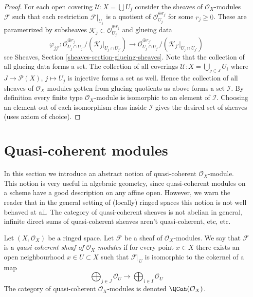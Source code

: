 \begin{proof}
For each open covering $\mathcal{U} : X = \bigcup U_j$ consider the
sheaves of $\mathcal{O}_X$-modules $\mathcal{F}$ such that each
restriction $\mathcal{F}|_{U_j}$ is a quotient of
$\mathcal{O}_{U_j}^{\oplus r_j}$ for some $r_j \geq 0$.
These are parametrized by subsheaves
$\mathcal{K}_j \subset \mathcal{O}_{U_j}^{\oplus r_j}$ and glueing
data
$$
\varphi_{jj'} :
\mathcal{O}_{U_j \cap U_{j'}}^{\oplus r_j}/
(\mathcal{K}_j|_{U_j \cap U_{j'}})
\longrightarrow
\mathcal{O}_{U_j \cap U_{j'}}^{\oplus r_{j'}}/
(\mathcal{K}_{j'}|_{U_j \cap U_{j'}})
$$
see Sheaves, Section \ref{sheaves-section-glueing-sheaves}.
Note that the collection of all glueing data forms a set.
The collection of all coverings $\mathcal{U} : X = \bigcup_{j \in J} U_i$
where $J \to \mathcal{P}(X)$, $j \mapsto U_j$ is injective forms a set as
well. Hence the collection of all sheaves of $\mathcal{O}_X$-modules
gotten from glueing quotients as above forms a set $\mathcal{I}$.
By definition every finite type $\mathcal{O}_X$-module
is isomorphic to an element of $\mathcal{I}$. Choosing an
element out of each isomorphism class inside $\mathcal{I}$
gives the desired set of sheaves (uses axiom of choice).
\end{proof}













\section{Quasi-coherent modules}
\label{section-quasi-coherent}

\noindent
In this section we introduce an abstract notion of
quasi-coherent $\mathcal{O}_X$-module. This notion is very
useful in algebraic geometry, since quasi-coherent modules
on a scheme have a good description on any affine open.
However, we warn the reader that
in the general setting of (locally) ringed spaces
this notion is not well behaved at all. The category of
quasi-coherent sheaves is not abelian in general, infinite
direct sums of quasi-coherent sheaves aren't quasi-coherent, etc, etc.

\begin{definition}
\label{definition-quasi-coherent}
Let $(X, \mathcal{O}_X)$ be a ringed space.
Let $\mathcal{F}$ be a sheaf of $\mathcal{O}_X$-modules.
We say that $\mathcal{F}$ is a {\it quasi-coherent
sheaf of $\mathcal{O}_X$-modules} if for every
point $x \in X$ there exists an open neighbourhood
$x\in U \subset X$ such that $\mathcal{F}|_U$
is isomorphic to the cokernel of a map
$$
\bigoplus\nolimits_{j \in J}
\mathcal{O}_U
\longrightarrow
\bigoplus\nolimits_{i \in I}
\mathcal{O}_U
$$
The category of quasi-coherent $\mathcal{O}_X$-modules
is denoted $\QCoh(\mathcal{O}_X)$.
\end{definition}

